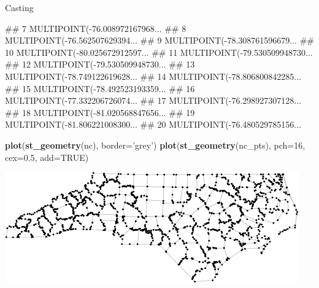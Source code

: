 \documentclass[11pt,ignorenonframetext,]{beamer}
\newenvironment{Shaded}{}{}
\newcommand{\KeywordTok}[1]{\textcolor[rgb]{0.00,0.44,0.13}{\textbf{#1}}}
\newcommand{\DataTypeTok}[1]{\textcolor[rgb]{0.56,0.13,0.00}{#1}}
\newcommand{\DecValTok}[1]{\textcolor[rgb]{0.25,0.63,0.44}{#1}}
\newcommand{\FloatTok}[1]{\textcolor[rgb]{0.25,0.63,0.44}{#1}}
\newcommand{\StringTok}[1]{\textcolor[rgb]{0.25,0.44,0.63}{#1}}
\newcommand{\OtherTok}[1]{\textcolor[rgb]{0.00,0.44,0.13}{#1}}
\newcommand{\NormalTok}[1]{#1}
\let\oldShaded\Shaded
\let\endoldShaded\endShaded
\renewenvironment{Shaded}{\footnotesize\begin{spacing}{0.9}\oldShaded}{\endoldShaded\end{spacing}}
\let\oldverbatim\verbatim
\let\endoldverbatim\endverbatim
\newcommand{\scriptoutput}{
  \renewenvironment{Shaded}{\scriptsize\begin{spacing}{0.9}\oldShaded}{\endoldShaded\end{spacing}}
  \renewenvironment{verbatim}{\scriptsize\begin{spacing}{0.9}\oldverbatim}{\endoldverbatim\end{spacing}}
}
\begin{document}
\begin{frame}[fragile,t]{Casting}
\begin{Shaded}
\begin{Highlighting}[]
\NormalTok{## 7  MULTIPOINT(-76.008972167968...}
\NormalTok{## 8  MULTIPOINT(-76.562507629394...}
\NormalTok{## 9  MULTIPOINT(-78.308761596679...}
\NormalTok{## 10 MULTIPOINT(-80.025672912597...}
\NormalTok{## 11 MULTIPOINT(-79.530509948730...}
\NormalTok{## 12 MULTIPOINT(-79.530509948730...}
\NormalTok{## 13 MULTIPOINT(-78.749122619628...}
\NormalTok{## 14 MULTIPOINT(-78.806800842285...}
\NormalTok{## 15 MULTIPOINT(-78.492523193359...}
\NormalTok{## 16 MULTIPOINT(-77.332206726074...}
\NormalTok{## 17 MULTIPOINT(-76.298927307128...}
\NormalTok{## 18 MULTIPOINT(-81.020568847656...}
\NormalTok{## 19 MULTIPOINT(-81.806221008300...}
\NormalTok{## 20 MULTIPOINT(-76.480529785156...}
\end{Highlighting}
\end{Shaded}

\end{frame}

\begin{frame}[fragile,t]{}

\scriptoutput

\begin{Shaded}
\begin{Highlighting}[]
\KeywordTok{plot}\NormalTok{(}\KeywordTok{st_geometry}\NormalTok{(nc), }\DataTypeTok{border=}\StringTok{'grey'}\NormalTok{)}
\KeywordTok{plot}\NormalTok{(}\KeywordTok{st_geometry}\NormalTok{(nc_pts), }\DataTypeTok{pch=}\DecValTok{16}\NormalTok{, }\DataTypeTok{cex=}\FloatTok{0.5}\NormalTok{, }\DataTypeTok{add=}\OtherTok{TRUE}\NormalTok{)}
\end{Highlighting}
\end{Shaded}

\begin{center}\includegraphics[width=0.95\textwidth]{Lec17_files/figure-beamer/unnamed-chunk-16-1} \end{center}

\end{frame}
\end{document}

